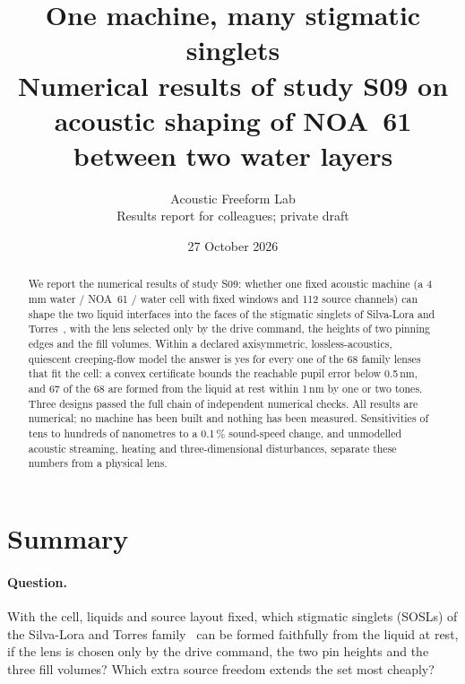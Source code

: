 \documentclass[11pt,a4paper]{article}
\title{One machine, many stigmatic singlets\\[0.5em]
\large Numerical results of study S09 on acoustic shaping of NOA~61 between two water layers}
\author{Acoustic Freeform Lab\\\small Results report for colleagues; private draft}
\date{27 October 2026}
\numberwithin{equation}{section}
\begin{document}
\maketitle
\begin{abstract}
We report the numerical results of study S09: whether one fixed acoustic machine
(a 4\,mm water / NOA~61 / water cell with fixed windows and 112 source channels)
can shape the two liquid interfaces into the faces of the stigmatic singlets of
Silva-Lora and Torres~\cite{silva2020}, with the lens selected only by the drive
command, the heights of two pinning edges and the fill volumes. Within a declared
axisymmetric, lossless-acoustics, quiescent creeping-flow model the answer is yes
for every one of the 68 family lenses that fit the cell: a convex certificate
bounds the reachable pupil error below 0.5\,nm, and 67 of the 68 are formed from
the liquid at rest within 1\,nm by one or two tones. Three designs passed the full
chain of independent numerical checks. All results are numerical; no machine has
been built and nothing has been measured. Sensitivities of tens to hundreds of
nanometres to a 0.1\,\% sound-speed change, and unmodelled acoustic streaming,
heating and three-dimensional disturbances, separate these numbers from a
physical lens.
\end{abstract}
{\small\tableofcontents}
\clearpage

\section{Summary}\label{sec:summary}

\paragraph{Question.} With the cell, liquids and source layout fixed, which
stigmatic singlets (SOSLs) of the Silva-Lora and Torres family~\cite{silva2020}
can be formed faithfully from the liquid at rest, if the lens is chosen only by
the drive command, the two pin heights and the three fill volumes? Which extra
source freedom extends the set most cheaply?
\end{document}
